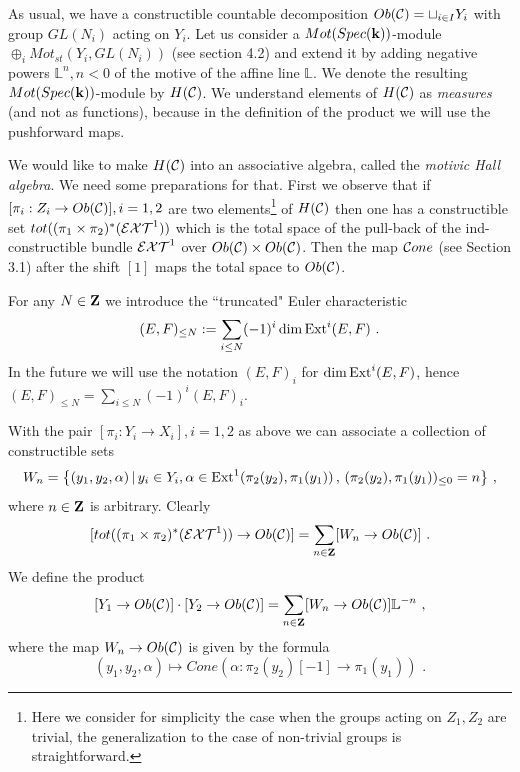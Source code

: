 \documentclass[12pt]{article}
\begin{document}
As usual, we have  a constructible countable decomposition  $Ob({\mathcal C})=\sqcup_{i\in I}Y_i$ with group $GL(N_i)$ acting on $Y_i$.
Let us consider a $Mot(Spec({\bf k}))$-module $\oplus_i Mot_{st}(Y_i,GL(N_i))$ (see section 4.2) and extend it by adding negative powers ${\mathbb L}^n, n<0$ of the motive of the affine line  ${\mathbb L}$. We denote the resulting $Mot(Spec({\bf k}))$-module by $H({\mathcal C})$.  We understand elements of 
$H({\mathcal C})$ as {\it measures} (and not as functions), because in the definition of the product we will use the pushforward maps.


We would like to make $H({\mathcal C})$ into an associative algebra, called the {\it motivic Hall algebra}. We need some preparations for that. First we observe that if $[\pi_i: Z_i\to Ob({\mathcal C})], i=1,2$ are two elements\footnote{Here we consider for simplicity the case when the groups acting on $Z_1,Z_2$ are trivial, the generalization to the case of non-trivial groups is straightforward.}
of $H({\mathcal C})$ then one has a constructible set
$tot((\pi_1\times \pi_2)^{\ast}({\cal EXT}^1))$ which is the total space of the pull-back
of the ind-constructible bundle ${\cal EXT}^1$ over $Ob({\mathcal C})\times Ob({\mathcal C})$.
Then the map ${{\cal C}one}$ (see Section 3.1) after the shift $[1]$  maps the total space to $Ob({\mathcal C})$.

For any $N\in {\bf Z}$ we introduce the ``truncated" Euler characteristic 
$$(E,F)_{\le N}:=\sum_{i\le N}(-1)^i\dim \operatorname{Ext}^i(E,F)\,\,.$$
In the future we will use the notation $(E,F)_i$ for $\dim \operatorname{Ext}^i(E,F)$, hence
$(E,F)_{\le N}=\sum_{i\le N}(-1)^i (E,F)_i$.

With the pair $[\pi_i: Y_i\to X_i], i=1,2$ as above we can associate a collection of
constructible sets
$$W_n  =\big\{(y_1,y_2,\alpha)\,|\,y_i\in Y_i, \alpha\in \operatorname{Ext}^1(\pi_2(y_2),\pi_1(y_1))\,,\,
 (\pi_2(y_2),\pi_1(y_1))_{\le 0}=n\big\}\,\,, $$
 where $n\in {\bf Z}$ is arbitrary.
Clearly $$[tot((\pi_1\times \pi_2)^{\ast}({\cal EXT}^1))\to Ob({\mathcal C})]=\sum_{n\in {\bf Z}}[W_n\to Ob({\mathcal C})]\,\,.$$
We define the product
$$[Y_1\to Ob({\mathcal C})]\cdot [Y_2\to Ob({\mathcal C})]=\sum_{n\in {\bf Z}}[W_n\to Ob({\mathcal C})]{\mathbb L}^{-n}\,\,,$$
where the map $W_n\to Ob({\mathcal C})$ is given by the formula
$$(y_1,y_2,\alpha)\mapsto Cone(\alpha: \pi_2(y_2)[-1]\to \pi_1(y_1))\,\,.$$
\end{document}

